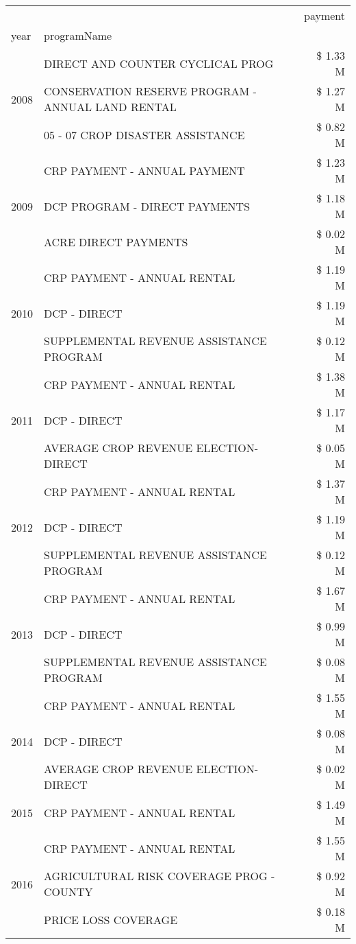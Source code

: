 \begin{tabular}{llr}
\toprule
 &  & payment \\
year & programName &  \\
\midrule
\multirow[t]{3}{*}{2008} & DIRECT AND COUNTER CYCLICAL PROG & \$ 1.33 M \\
 & CONSERVATION RESERVE PROGRAM - ANNUAL LAND RENTAL & \$ 1.27 M \\
 & 05 - 07 CROP DISASTER ASSISTANCE & \$ 0.82 M \\
\cline{1-3}
\multirow[t]{3}{*}{2009} & CRP PAYMENT - ANNUAL PAYMENT & \$ 1.23 M \\
 & DCP PROGRAM - DIRECT PAYMENTS & \$ 1.18 M \\
 & ACRE DIRECT PAYMENTS & \$ 0.02 M \\
\cline{1-3}
\multirow[t]{3}{*}{2010} & CRP PAYMENT - ANNUAL RENTAL & \$ 1.19 M \\
 & DCP - DIRECT & \$ 1.19 M \\
 & SUPPLEMENTAL REVENUE ASSISTANCE PROGRAM & \$ 0.12 M \\
\cline{1-3}
\multirow[t]{3}{*}{2011} & CRP PAYMENT - ANNUAL RENTAL & \$ 1.38 M \\
 & DCP - DIRECT & \$ 1.17 M \\
 & AVERAGE CROP REVENUE ELECTION-DIRECT & \$ 0.05 M \\
\cline{1-3}
\multirow[t]{3}{*}{2012} & CRP PAYMENT - ANNUAL RENTAL & \$ 1.37 M \\
 & DCP - DIRECT & \$ 1.19 M \\
 & SUPPLEMENTAL REVENUE ASSISTANCE PROGRAM & \$ 0.12 M \\
\cline{1-3}
\multirow[t]{3}{*}{2013} & CRP PAYMENT - ANNUAL RENTAL & \$ 1.67 M \\
 & DCP - DIRECT & \$ 0.99 M \\
 & SUPPLEMENTAL REVENUE ASSISTANCE PROGRAM & \$ 0.08 M \\
\cline{1-3}
\multirow[t]{3}{*}{2014} & CRP PAYMENT - ANNUAL RENTAL & \$ 1.55 M \\
 & DCP - DIRECT & \$ 0.08 M \\
 & AVERAGE CROP REVENUE ELECTION-DIRECT & \$ 0.02 M \\
\cline{1-3}
2015 & CRP PAYMENT - ANNUAL RENTAL & \$ 1.49 M \\
\cline{1-3}
\multirow[t]{3}{*}{2016} & CRP PAYMENT - ANNUAL RENTAL & \$ 1.55 M \\
 & AGRICULTURAL RISK COVERAGE PROG - COUNTY & \$ 0.92 M \\
 & PRICE LOSS COVERAGE & \$ 0.18 M \\

\end{tabular}
